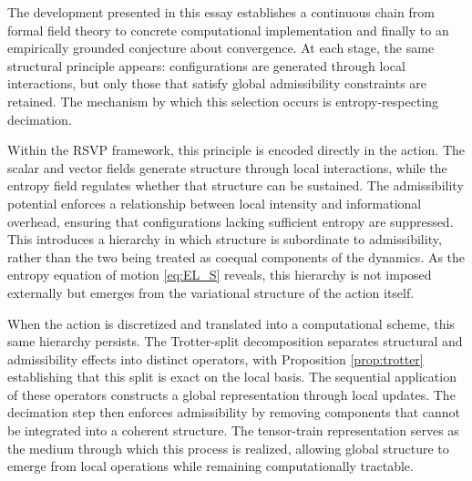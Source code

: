 \documentclass[11pt]{article}
\theoremstyle{definition}
\begin{document}
The development presented in this essay establishes a continuous chain from
formal field theory to concrete computational implementation and finally to an
empirically grounded conjecture about convergence. At each stage, the same
structural principle appears: configurations are generated through local
interactions, but only those that satisfy global admissibility constraints are
retained. The mechanism by which this selection occurs is entropy-respecting
decimation.

Within the RSVP framework, this principle is encoded directly in the action.
The scalar and vector fields generate structure through local interactions,
while the entropy field regulates whether that structure can be sustained. The
admissibility potential enforces a relationship between local intensity and
informational overhead, ensuring that configurations lacking sufficient entropy
are suppressed. This introduces a hierarchy in which structure is subordinate
to admissibility, rather than the two being treated as coequal components of
the dynamics. As the entropy equation of motion \eqref{eq:EL_S} reveals, this
hierarchy is not imposed externally but emerges from the variational structure
of the action itself.

When the action is discretized and translated into a computational scheme, this
same hierarchy persists. The Trotter-split decomposition separates structural
and admissibility effects into distinct operators, with Proposition
\ref{prop:trotter} establishing that this split is exact on the local basis.
The sequential application of these operators constructs a global
representation through local updates. The decimation step then enforces
admissibility by removing components that cannot be integrated into a coherent
structure. The tensor-train representation serves as the medium through which
this process is realized, allowing global structure to emerge from local
operations while remaining computationally tractable.
\end{document}
